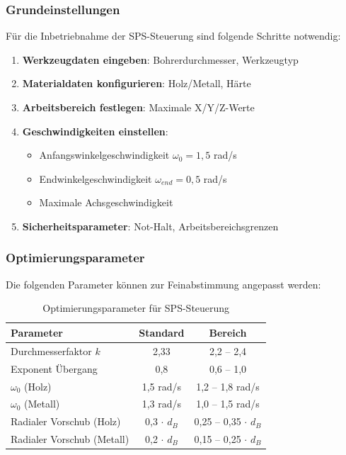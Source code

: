 ﻿\documentclass[12pt,a4paper]{article}
\begin{document}
\subsubsection{Grundeinstellungen}

Für die Inbetriebnahme der SPS-Steuerung sind folgende Schritte notwendig:

\begin{enumerate}
	\item \textbf{Werkzeugdaten eingeben}: Bohrerdurchmesser, Werkzeugtyp
	\item \textbf{Materialdaten konfigurieren}: Holz/Metall, Härte
	\item \textbf{Arbeitsbereich festlegen}: Maximale X/Y/Z-Werte
	\item \textbf{Geschwindigkeiten einstellen}: 
	\begin{itemize}
		\item Anfangswinkelgeschwindigkeit $\omega_0 = 1{,}5$ rad/s
		\item Endwinkelgeschwindigkeit $\omega_{end} = 0{,}5$ rad/s
		\item Maximale Achsgeschwindigkeit
	\end{itemize}
	\item \textbf{Sicherheitsparameter}: Not-Halt, Arbeitsbereichsgrenzen
\end{enumerate}

\subsubsection{Optimierungsparameter}

Die folgenden Parameter können zur Feinabstimmung angepasst werden:

\begin{table}[H]
	\centering
	\begin{tabular}{|l|c|c|}
		\hline
		\textbf{Parameter} & \textbf{Standard} & \textbf{Bereich} \\
		\hline
		Durchmesserfaktor $k$ & 2,33 & 2,2 -- 2,4 \\
		Exponent Übergang & 0,8 & 0,6 -- 1,0 \\
		$\omega_0$ (Holz) & 1,5 rad/s & 1,2 -- 1,8 rad/s \\
		$\omega_0$ (Metall) & 1,3 rad/s & 1,0 -- 1,5 rad/s \\
		Radialer Vorschub (Holz) & 0,3 $\cdot$ $d_B$ & 0,25 -- 0,35 $\cdot$ $d_B$ \\
		Radialer Vorschub (Metall) & 0,2 $\cdot$ $d_B$ & 0,15 -- 0,25 $\cdot$ $d_B$ \\
		\hline
	\end{tabular}
	\caption{Optimierungsparameter für SPS-Steuerung}
\end{table}
\end{document}
